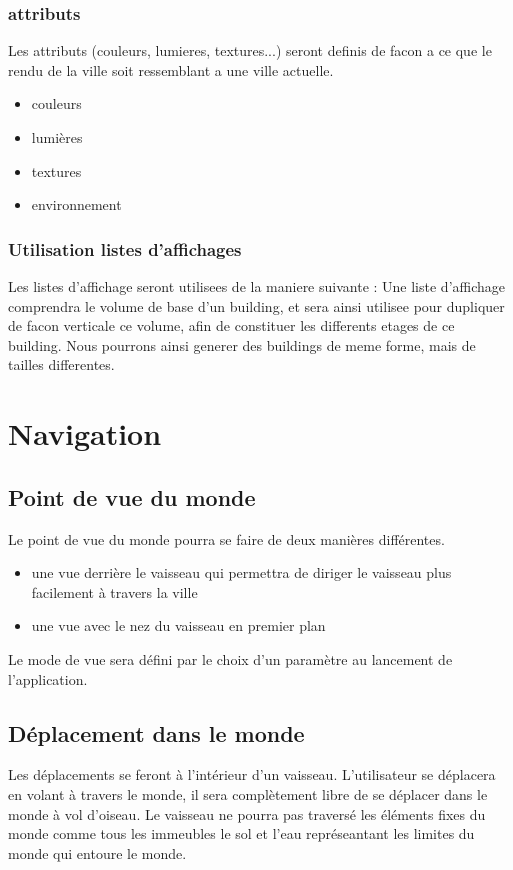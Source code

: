 \documentclass[a4paper,11pt]{article}
\begin{document}
\subsubsection{attributs}
Les attributs (couleurs, lumieres, textures...) seront definis de facon a ce que le rendu de la ville soit ressemblant a une ville actuelle. 
\begin{itemize}
\item couleurs
\item lumières
\item textures
\item environnement
\end{itemize}

\subsubsection{Utilisation listes d'affichages}

Les listes d'affichage seront utilisees de la maniere suivante : 
    Une liste d'affichage comprendra le volume de base d'un building, et sera ainsi utilisee pour dupliquer de facon verticale ce volume, afin de constituer les differents etages de ce building.  Nous pourrons ainsi generer des buildings de meme forme, mais de tailles differentes. 
\section{Navigation}

\subsection{Point de vue du monde}
Le point de vue du monde pourra se faire de deux manières différentes.

\begin{itemize}
\item une vue derrière le vaisseau qui permettra de diriger le vaisseau plus facilement à travers la ville
\item une vue avec le nez du vaisseau en premier plan
\end{itemize}

Le mode de vue sera défini par le choix d'un paramètre au lancement de l'application.

\subsection{Déplacement dans le monde}
    
Les déplacements se feront à l'intérieur d'un vaisseau. L'utilisateur se déplacera en volant à travers le monde, il sera complètement libre de se déplacer dans le monde à vol d'oiseau. 
Le vaisseau ne pourra pas traversé les éléments fixes du monde comme tous les immeubles le sol et l'eau représeantant les limites du monde qui entoure le monde.
 
\end{document}
